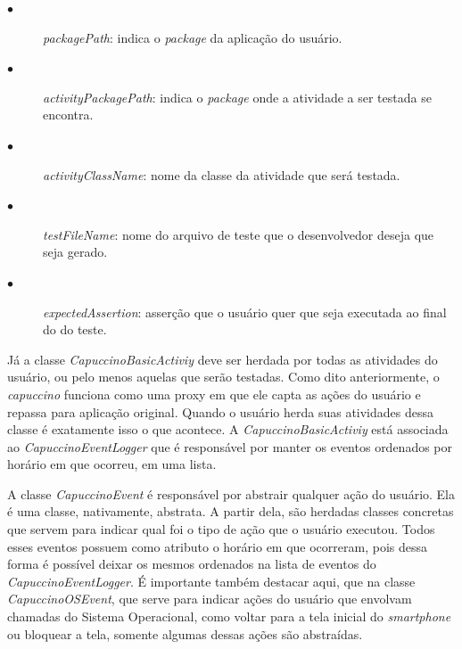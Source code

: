 \documentclass[
    12pt,       %
    openright,      %
    twoside,      %
    a4paper,      %
    english,      %
    french,       %
    spanish,      %
    brazil,       %
    ]{abntex2}
\begin{document}
        \begin{description}
          \item[$\bullet$] \textit{packagePath}: indica o \textit{package} da aplicação do usuário.
          \item[$\bullet$] \textit{activityPackagePath}: indica o \textit{package} onde a atividade a
                                                         ser testada se encontra.

          \item[$\bullet$] \textit{activityClassName}: nome da classe da atividade que será testada.
          \item[$\bullet$] \textit{testFileName}: nome do arquivo de teste que o desenvolvedor deseja que seja
                                                  gerado.

          \item[$\bullet$] \textit{expectedAssertion}:  asserção que o usuário quer que seja executada ao final do
                                                        do teste.
        \end{description}

        Já a classe \textit{CapuccinoBasicActiviy} deve ser herdada por todas as atividades do usuário,
        ou pelo menos aquelas que serão testadas. Como dito anteriormente, o \textit{capuccino} funciona
        como uma proxy em que ele capta as ações do usuário e repassa para aplicação original. Quando
        o usuário herda suas atividades dessa classe é exatamente isso o que acontece. A
        \textit{CapuccinoBasicActiviy} está associada ao \textit{CapuccinoEventLogger} que é responsável
        por manter os eventos ordenados por horário em que ocorreu, em uma lista.

        A classe \textit{CapuccinoEvent} é responsável por abstrair qualquer ação do usuário. Ela é uma
        classe, nativamente, abstrata. A partir dela, são herdadas classes concretas que servem para indicar
        qual foi o tipo de ação que o usuário executou. Todos esses eventos possuem como atributo o horário
        em que ocorreram, pois dessa forma é possível deixar os mesmos ordenados na lista de eventos do
        \textit{CapuccinoEventLogger}. É importante também destacar aqui, que na classe \textit{CapuccinoOSEvent},
        que serve para indicar ações do usuário que envolvam chamadas do Sistema Operacional, como voltar
        para a tela inicial do \textit{smartphone} ou bloquear a tela, somente algumas dessas ações são
        abstraídas.
\end{document}
